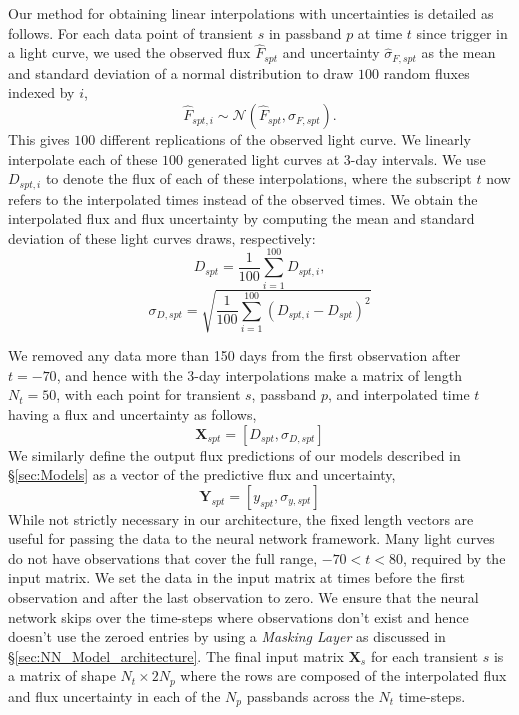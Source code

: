 \documentclass[fleqn,usenatbib]{mnras}
\begin{document}
Our method for obtaining linear interpolations with uncertainties is detailed as follows. For each data point of transient $s$ in passband $p$ at time $t$ since trigger in a light curve, we used the observed flux $\hat{F}_{spt}$ and uncertainty $\hat{\sigma}_{F,{spt}}$ as the mean and standard deviation of a normal distribution to draw $100$ random fluxes indexed by $i$,
\begin{equation}
    \hat{F}_{spt, i} \sim \mathcal{N}(\hat{F}_{spt}, \hat{\sigma}_{F,{spt}}).
\end{equation}
This gives $100$ different replications of the observed light curve. We linearly interpolate each of these $100$ generated light curves at $3$-day intervals. We use $D_{spt, i}$ to denote the flux of each of these interpolations, where the subscript $t$ now refers to the interpolated times instead of the observed times. We obtain the interpolated flux and flux uncertainty by computing the mean and standard deviation of these light curves draws, respectively:
\begin{equation}
    D_{spt} = \frac{1}{100}\sum_{i=1}^{100} D_{spt, i},
\end{equation}
\begin{equation}
    \sigma_{D,{spt}} = \sqrt{\frac{1}{100}\sum_{i=1}^{100} \left(D_{spt, i} - D_{spt} \right)^2}
\end{equation}

We removed any data more than 150 days from the first observation after $t=-70$, and hence with the 3-day interpolations make a matrix of length $N_t=50$, with each point for transient $s$, passband $p$, and interpolated time $t$ having a flux and uncertainty as follows,
\begin{equation}
    \bm{X}_{spt} = \left[D_{spt}, \sigma_{D,{spt}} \right] 
\label{eq:X_input}
\end{equation}
We similarly define the output flux predictions of our models described in \S\ref{sec:Models} as a vector of the predictive flux and uncertainty,
\begin{equation}
    \bm{Y}_{spt} = \left[y_{spt}, \sigma_{y,{spt}} \right] 
\label{eq:Y_predictions}
\end{equation}
While not strictly necessary in our architecture, the fixed length vectors are useful for passing the data to the neural network framework. Many light curves do not have observations that cover the full range, $-70 < t < 80$, required by the input matrix. We set the data in the input matrix at times before the first observation and after the last observation to zero. We ensure that the neural network skips over the time-steps where observations don’t exist and hence doesn’t use the zeroed entries by using a \textit{Masking Layer} as discussed in \S\ref{sec:NN_Model_architecture}. The final input matrix $\bm{X}_s$ for each transient $s$ is a matrix of shape $N_t \times 2N_p$ where the rows are composed of the interpolated flux and flux uncertainty in each of the $N_p$ passbands across the $N_t$ time-steps.
\end{document}
